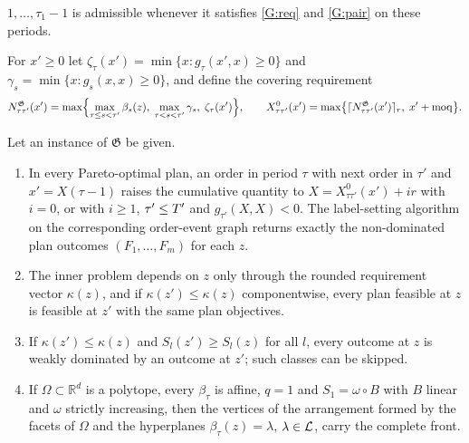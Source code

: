 \begin{definition}
\begin{enumerate}[label=(G\arabic*),leftmargin=*,nosep]
      $1,\dots,\tau_1-1$ is admissible whenever it satisfies \ref{G:req} and \ref{G:pair} on
      these periods.
  \end{enumerate}
  For $x'\ge0$ let $\zeta_\tau(x')=\min\{x:g_\tau(x',x)\ge0\}$ and
  $\gamma_s=\min\{x:g_s(x,x)\ge0\}$, and define the covering requirement
  \begin{equation}\label{eq:cover-general}
    N^{\mathfrak{G}}_{\tau\tau'}(x')=\max\Bigl\{\max_{\tau\le s<\tau'}\beta_s(z),\;
      \max_{\tau<s<\tau'}\gamma_s,\;\zeta_\tau(x')\Bigr\},
    \qquad X^0_{\tau\tau'}(x')=\max\bigl\{\lceil N^{\mathfrak{G}}_{\tau\tau'}(x')\rceil_r,\;x'+\mathrm{moq}\bigr\}.
  \end{equation}
\end{definition}

\begin{theorem}\label{thm:general}
  Let an instance of $\mathfrak{G}$ be given.
  \begin{enumerate}[label=(\alph*),nosep]
    \item\label{gen:a} In every Pareto-optimal plan, an order in period $\tau$ with next order
      in $\tau'$ and $x'=X(\tau-1)$ raises the cumulative quantity to
      $X=X^0_{\tau\tau'}(x')+ir$ with $i=0$, or with $i\ge1$, $\tau'\le T'$ and
      $g_{\tau'}(X,X)<0$. The label-setting algorithm on the corresponding order-event graph
      returns exactly the non-dominated plan outcomes $(F_1,\dots,F_m)$ for each $z$.
    \item\label{gen:b} The inner problem depends on $z$ only through the rounded requirement
      vector $\kappa(z)$, and if $\kappa(z')\le\kappa(z)$ componentwise, every plan feasible at
      $z$ is feasible at $z'$ with the same plan objectives.
    \item\label{gen:c} If $\kappa(z')\le\kappa(z)$ and $S_l(z')\ge S_l(z)$ for all $l$, every
      outcome at $z$ is weakly dominated by an outcome at $z'$; such classes can be skipped.
    \item\label{gen:d} If $\Omega\subset\mathbb{R}^d$ is a polytope, every $\beta_\tau$ is affine,
      $q=1$ and $S_1=\omega\circ B$ with $B$ linear and $\omega$ strictly increasing, then the
      vertices of the arrangement formed by the facets of $\Omega$ and the hyperplanes
      $\beta_\tau(z)=\lambda$, $\lambda\in\mathcal{L}$, carry the complete front.
  \end{enumerate}
\end{theorem}


